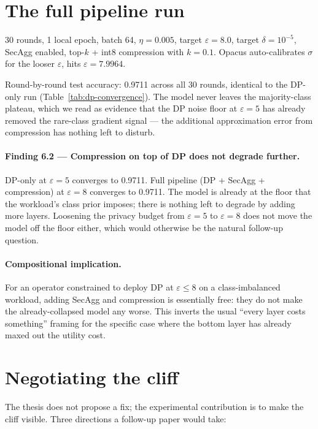 \documentclass[11pt,a4paper]{report}
\begin{document}
\section{The full pipeline run}

30 rounds, 1 local epoch, batch 64, $\eta = 0.005$, target
$\varepsilon = 8.0$, target $\delta = 10^{-5}$, SecAgg enabled,
top-$k$ + int8 compression with $k = 0.1$.
Opacus auto-calibrates $\sigma$ for the looser $\varepsilon$, hits
$\varepsilon = 7.9964$.

Round-by-round test accuracy: 0.9711 across all 30 rounds, identical to
the DP-only run (Table~\ref{tab:dp-convergence}). The model never leaves
the majority-class plateau, which we read as evidence that the DP noise
floor at $\varepsilon = 5$ has already removed the rare-class gradient
signal --- the additional approximation error from compression has
nothing left to disturb.

\paragraph{Finding 6.2 --- Compression on top of DP does not degrade further.}
DP-only at $\varepsilon = 5$ converges to 0.9711. Full pipeline (DP +
SecAgg + compression) at $\varepsilon = 8$ converges to 0.9711.
The model is already at the floor that the workload's class prior
imposes; there is nothing left to degrade by adding more layers.
Loosening the privacy budget from $\varepsilon = 5$ to $\varepsilon = 8$
does not move the model off the floor either, which would otherwise be
the natural follow-up question.

\paragraph{Compositional implication.}
For an operator constrained to deploy DP at $\varepsilon \le 8$ on a
class-imbalanced workload, adding SecAgg and compression is essentially
free: they do not make the already-collapsed model any worse. This
inverts the usual ``every layer costs something'' framing for the
specific case where the bottom layer has already maxed out the
utility cost.

\section{Negotiating the cliff}\label{sec:negotiating}

The thesis does not propose a fix; the experimental contribution is to
make the cliff visible. Three directions a follow-up paper would take:
\end{document}
